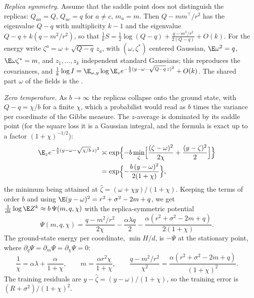 \begin{refsection}
\begin{heuristic}
\emph{Replica symmetry.} Assume that the saddle point does not distinguish the replicas: $Q_{aa}=Q$, $Q_{ac}=q$ for $a\ne c$, $m_a=m$. Then $Q-mm^\top/r^2$ has the eigenvalue $Q-q$ with multiplicity $k-1$ and the eigenvalue $Q-q+k(q-m^2/r^2)$, so that $\frac1kS=\frac12\log(Q-q)+\frac{q-m^2/r^2}{2(Q-q)}+O(k)$. For the energy write $\zeta^a=\omega+\sqrt{Q-q}\,z_a$, with $(\omega,\zeta^*)$ centered Gaussian, $\E\omega^2=q$, $\E\omega\zeta^*=m$, and $z_1,\dots,z_k$ independent standard Gaussians; this reproduces the covariances, and $\frac1k\log I=\E_{\omega,y}\log\E_ze^{-\frac b2(y-\omega-\sqrt{Q-q}\,z)^2}+O(k)$. The shared part $\omega$ of the fields is the .

\emph{Zero temperature.} As $b\to\infty$ the replicas collapse onto the ground state, with $Q-q=\chi/b$ for a finite  $\chi$, which a probabilist would read as $b$ times the variance per coordinate of the Gibbs measure. The $z$-average is dominated by its saddle point (for the square loss it is a Gaussian integral, and the formula is exact up to a factor $(1+\chi)^{-1/2}$):
\begin{equation}\label{eq:ridge:prox}
\begin{aligned}
\E_ze^{-\frac b2(y-\omega-\sqrt{\chi/b}\,z)^2}&\asymp\exp\Bigl\{-b\min_\zeta\Bigl[\frac{(\zeta-\omega)^2}{2\chi}+\frac{(y-\zeta)^2}2\Bigr]\Bigr\}\\
&=\exp\Bigl\{-\frac{b\,(y-\omega)^2}{2(1+\chi)}\Bigr\},
\end{aligned}
\end{equation}
the minimum being attained at $\hat\zeta=(\omega+\chi y)/(1+\chi)$. Keeping the terms of order $b$ and using $\E(y-\omega)^2=r^2+\sigma^2-2m+q$, we get $\frac1{dk}\log\E Z^k\approx b\,\Psi(m,q,\chi)$ with the replica-symmetric potential
\[
\Psi(m,q,\chi)=\frac{q-m^2/r^2}{2\chi}-\frac{\alpha\lambda q}2-\frac{\alpha(r^2+\sigma^2-2m+q)}{2(1+\chi)}.
\]
The ground-state energy per coordinate, $\min H/d$, is $-\Psi$ at the stationary point, where $\partial_q\Psi=\partial_m\Psi=\partial_\chi\Psi=0$:
\begin{equation}\label{eq:ridge:saddle}
\frac1\chi=\alpha\lambda+\frac\alpha{1+\chi},\qquad m=\frac{\alpha r^2\chi}{1+\chi},\qquad\frac{q-m^2/r^2}{\chi^2}=\frac{\alpha(r^2+\sigma^2-2m+q)}{(1+\chi)^2}.
\end{equation}
The training residuals are $y-\hat\zeta=(y-\omega)/(1+\chi)$, so the training error is $(R+\sigma^2)/(1+\chi)^2$.
\end{heuristic}


\end{refsection}
